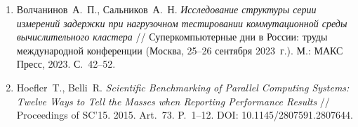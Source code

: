 \begin{enumerate}
\item
    Волчанинов~А.~П., Сальников~А.~Н.
    \emph{Исследование структуры серии измерений задержки при нагрузочном тестировании коммутационной среды вычислительного кластера} // Суперкомпьютерные дни в России: труды международной конференции (Москва, 25--26 сентября 2023~г.). М.: МАКС Пресс, 2023. С.~42--52.

\item
    Hoefler~T., Belli~R.
    \emph{Scientific Benchmarking of Parallel Computing Systems: Twelve Ways to Tell the Masses when Reporting Performance Results} // Proceedings of SC'15. 2015. Art.~73. P.~1--12. DOI: 10.1145/2807591.2807644.

\end{enumerate}
